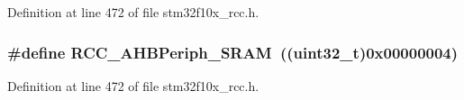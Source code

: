 Definition at line 472 of file stm32f10x\+\_\+rcc.\+h.

\subsubsection[{\texorpdfstring{R\+C\+C\+\_\+\+A\+H\+B\+Periph\+\_\+\+S\+R\+AM}{RCC_AHBPeriph_SRAM}}]{\setlength{\rightskip}{0pt plus 5cm}\#define R\+C\+C\+\_\+\+A\+H\+B\+Periph\+\_\+\+S\+R\+AM~(({\bf uint32\+\_\+t})0x00000004)}\hypertarget{group___a_h_b__peripheral_ga8aec305b766b1c0ae297f8e1be103bd1}{}\label{group___a_h_b__peripheral_ga8aec305b766b1c0ae297f8e1be103bd1}


Definition at line 472 of file stm32f10x\+\_\+rcc.\+h.

